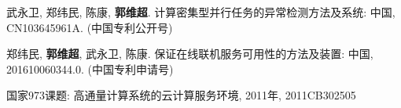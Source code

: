 \begin{resume}
  \begin{achievements}
    \item 武永卫, 郑纬民, 陈康, \textbf{郭维超}. 计算密集型并行任务的异常检测方法及系统: 
    中国, CN103645961A. (中国专利公开号)
    \item 郑纬民, \textbf{郭维超}, 武永卫, 陈康. 保证在线联机服务可用性的方法及装置: 
    中国, 201610060344.0. (中国专利申请号)
  \end{achievements}

  \begin{achievements}
    \item 国家973课题: 高通量计算系统的云计算服务环境, 2011年, 2011CB302505
  \end{achievements}

\end{resume}
